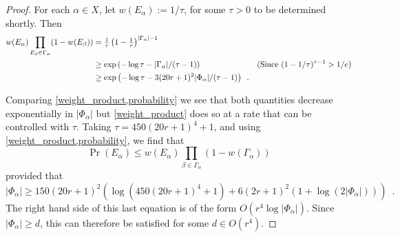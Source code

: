 \documentclass{patmorin}
\begin{document}
\begin{proof}
  For each $\alpha\in X$, let $w(E_\alpha):=1/\tau$, for some $\tau>0$ to be determined shortly.  Then
  \begin{align}
    w(E_\alpha)\prod_{E_\beta\in\Gamma_\alpha} (1-w(E_\beta))
    & = \tfrac{1}{\tau}\left(1-\tfrac{1}{\tau}\right)^{|\Gamma_\alpha|-1} \notag \\
    & \ge \exp\left(-\log\tau - |\Gamma_\alpha|/(\tau-1)\right) & \text{(Since $(1-1/\tau)^{\tau-1} > 1/e$)} \notag \\
    & \ge \exp\left(-\log\tau - 3(20r+1)^2|\Phi_\alpha|/(\tau-1)\right) \enspace . \label{weight_product}
  \end{align}
  
  Comparing \cref{weight_product,probability} we see that both quantities decrease exponentially in $|\Phi_\alpha|$ but \cref{weight_product} does so at a rate that can be controlled with $\tau$.
  Taking $\tau = 450(20r+1)^4+1$, and using \cref{weight_product,probability}, we find that
  \[
     \Pr\left(E_\alpha\right) \le w(E_\alpha)\prod_{\beta\in\Gamma_\alpha}(1-w(\Gamma_\alpha))
  \]
  provided that 
  \[   |\Phi_\alpha| \ge 150(20r+1)^2\left(\log\left(450(20r+1)^4+1\right) + 6(2r+1)^2(1+\log(2|\Phi_\alpha|)) \right) \enspace .
  \]
  The right hand side of this last equation is of the form $O(r^4\log|\Phi_\alpha|)$.  Since $|\Phi_\alpha|\ge d$, this can therefore be satisfied for some $d\in O(r^4)$.  
  
  


\end{proof}
\end{document}
